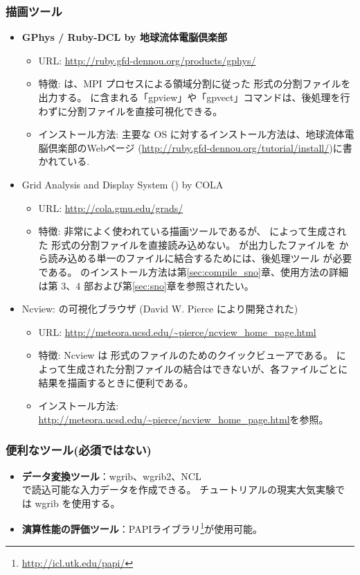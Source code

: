 \subsubsection{\bf 描画ツール}
\begin{itemize}
  \item {\bf GPhys / Ruby-DCL by 地球流体電脳倶楽部}
  \begin{itemize}
    \item URL: \url{http://ruby.gfd-dennou.org/products/gphys/}
    \item 特徴: {\scalelib}は、MPI プロセスによる領域分割に従った {\netcdf} 形式の分割ファイルを出力する。
    {\gphys}に含まれる「gpview」や「gpvect」コマンドは、後処理を行わずに分割ファイルを直接可視化できる。
    \item インストール方法: 主要な OS に対するインストール方法は、地球流体電脳倶楽部のWebページ
    (\url{http://ruby.gfd-dennou.org/tutorial/install/})に書かれている.
  \end{itemize}
  \item Grid Analysis and Display System ({\grads}) by COLA
  \begin{itemize}
    \item URL: \url{http://cola.gmu.edu/grads/}
    \item 特徴: 非常によく使われている描画ツールであるが、 \scalelib によって生成された {\netcdf}形式の分割ファイルを直接読み込めない。
    \scalelib が出力したファイルを {\grads} から読み込める単一のファイルに結合するためには、後処理ツール \sno が必要である。
    \sno のインストール方法は第\ref{sec:compile_sno}章、使用方法の詳細は第 3、4 部および第\ref{sec:sno}章を参照されたい。
 \end{itemize}
 \item Ncview: {\netcdf} の可視化ブラウザ (David W. Pierce により開発された)
  \begin{itemize}
  \item URL: \url{http://meteora.ucsd.edu/~pierce/ncview_home_page.html}
  \item 特徴: Ncview は {\netcdf}形式のファイルのためのクイックビューアである。
  \scalelib によって生成された分割ファイルの結合はできないが、各ファイルごとに結果を描画するときに便利である。
  \item インストール方法: \url{http://meteora.ucsd.edu/~pierce/ncview_home_page.html}を参照。
 \end{itemize}
\end{itemize}

\subsubsection{\bf 便利なツール(必須ではない)}
\begin{itemize}
  \item {\bf データ変換ツール}：wgrib、wgrib2、NCL \\
  \scalerm で読込可能な入力データを作成できる。
  チュートリアルの現実大気実験では wgrib を使用する。
  \item {\bf 演算性能の評価ツール}：PAPIライブラリ\footnote{\url{http://icl.utk.edu/papi/}}が使用可能。
\end{itemize}
